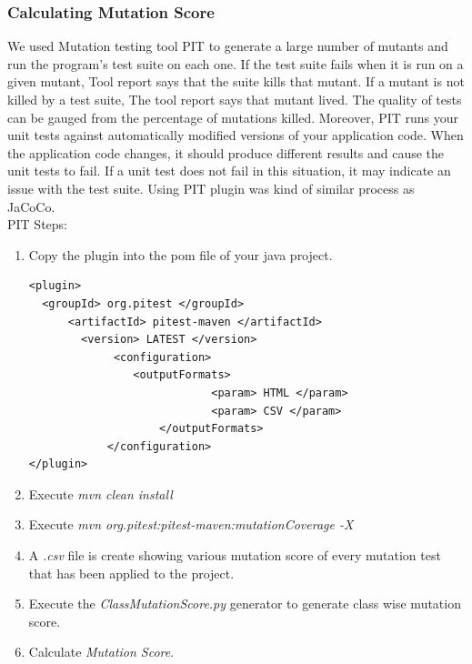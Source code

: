 \documentclass[letterpaper, 12 pt, conference]{ieeetran}  %
\begin{document}
\subsubsection{ Calculating Mutation Score}
We used Mutation testing tool PIT to generate a large number of mutants and run the program’s test suite on each one. If the test suite fails when it is run on a given mutant, Tool report says that the suite kills that mutant.
If a mutant is not killed by a test suite, The tool report says that mutant lived.
The quality of tests can be gauged from the percentage of mutations killed.
Moreover, PIT runs your unit tests against automatically modified versions of your application code. 
When the application code changes, it should produce different results and cause the unit tests to fail. \cite{pit}
If a unit test does not fail in this situation, it may indicate an issue with the test suite. Using PIT plugin was kind of similar process as JaCoCo.
\\PIT Steps:
  \begin{enumerate}[i]
    \item Copy the plugin into the pom file of your java project.
\begin{verbatim} 
<plugin> 
  <groupId> org.pitest </groupId> 
	  <artifactId> pitest-maven </artifactId> 
    	<version> LATEST </version> 
    		 <configuration> 
    		    <outputFormats> 
            				<param> HTML </param> 
            				<param> CSV </param> 
    			    </outputFormats> 
    		</configuration> 
</plugin>
\end{verbatim}
    \item Execute \textit{mvn clean install}
    \item Execute \textit{mvn org.pitest:pitest-maven:mutationCoverage -X}
    \item A \textit{ .csv} file is create showing various mutation score of every mutation test that has been applied to the project.
    \item Execute the \textit{ClassMutationScore.py} generator to generate class wise mutation score.
    \item Calculate \textit{Mutation Score}.
  \end{enumerate}
\smallskip
\end{document}
